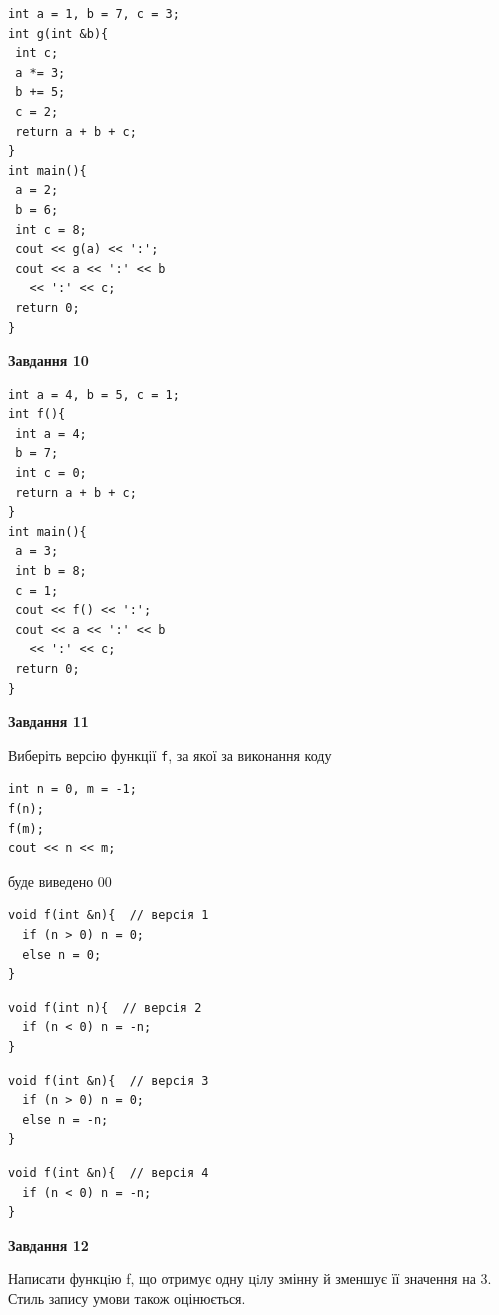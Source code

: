 \documentclass[12pt, ukrainian]{article}
\def\code#1{\Verb!#1!}
\begin{document}
{\begin {large}
\begin{minipage}[t]{7.0cm}
\begin{verbatim}
int a = 1, b = 7, c = 3;
int g(int &b){
 int c;
 a *= 3;
 b += 5;
 c = 2;
 return a + b + c;
}
int main(){
 a = 2;
 b = 6;
 int c = 8;
 cout << g(a) << ':';
 cout << a << ':' << b 
   << ':' << c;
 return 0;
}
\end{verbatim}



\begin{center}
\textbf{Завдання 10}
\end{center}
\vspace{-8mm}

\begin{verbatim}
int a = 4, b = 5, c = 1;
int f(){
 int a = 4;
 b = 7;
 int c = 0;
 return a + b + c;
}
int main(){
 a = 3;
 int b = 8;
 c = 1;
 cout << f() << ':';
 cout << a << ':' << b 
   << ':' << c;
 return 0;
}
\end{verbatim}

\end{minipage}
\vline \hspace{1mm}
\begin{minipage}[t]{11.0cm}

\begin{center}
\textbf{Завдання 11}
\end{center}
Виберіть версію функції \code{f}, за якої за виконання коду
\begin{verbatim}
int n = 0, m = -1;
f(n);
f(m);
cout << n << m;
\end{verbatim}

буде виведено 00

\begin{verbatim}
void f(int &n){  // версія 1
  if (n > 0) n = 0;
  else n = 0;
}
\end{verbatim}

\vspace{-8mm}\begin{verbatim}
void f(int n){  // версія 2
  if (n < 0) n = -n;
}
\end{verbatim}

\vspace{-8mm}\begin{verbatim}
void f(int &n){  // версія 3
  if (n > 0) n = 0;
  else n = -n;
}
\end{verbatim}

\vspace{-8mm}\begin{verbatim}
void f(int &n){  // версія 4
  if (n < 0) n = -n;
}
\end{verbatim}



\begin{center}
\textbf{Завдання 12}
\end{center}

Написати функцiю f, що отримує одну цiлу змінну й зменшує її значення на 3. Стиль запису умови також оцінюється.\par

\end{minipage}

\end {large}}
\newpage
\end{document}
